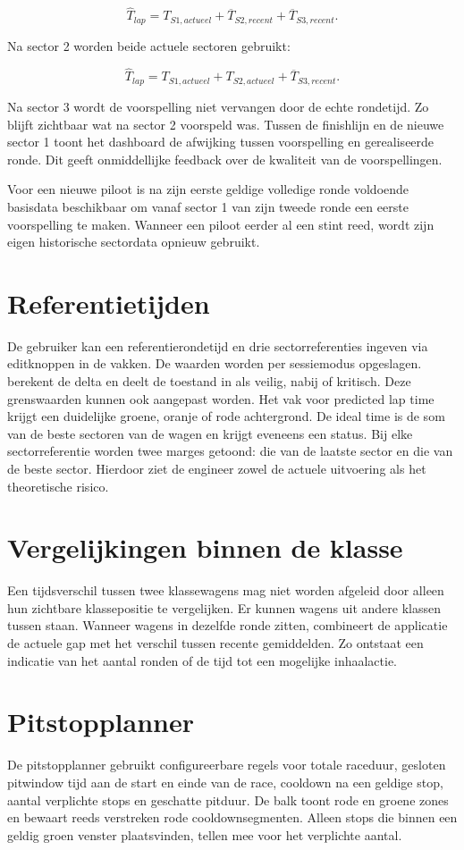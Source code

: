 \[ \hat{T}_{lap} = T_{S1,actueel} + \overline{T}_{S2,recent} + \overline{T}_{S3,recent}. \]

Na sector 2 worden beide actuele sectoren gebruikt:

\[ \hat{T}_{lap} = T_{S1,actueel} + T_{S2,actueel} + \overline{T}_{S3,recent}. \]

Na sector 3 wordt de voorspelling niet vervangen door de echte rondetijd. Zo blijft zichtbaar wat na
sector 2 voorspeld was. Tussen de finishlijn en de nieuwe sector 1 toont het dashboard de afwijking
tussen voorspelling en gerealiseerde ronde. Dit geeft onmiddellijke feedback over de kwaliteit van
de voorspellingen.

Voor een nieuwe piloot is na zijn eerste geldige volledige ronde voldoende basisdata beschikbaar om
vanaf sector 1 van zijn tweede ronde een eerste voorspelling te maken. Wanneer een piloot eerder al
een stint reed, wordt zijn eigen historische sectordata opnieuw gebruikt.

\section{Referentietijden}
De gebruiker kan een referentierondetijd en drie sectorreferenties ingeven via editknoppen in de vakken. De waarden worden per sessiemodus opgeslagen.  berekent de
delta en deelt de toestand in als veilig, nabij of kritisch. Deze grenswaarden kunnen ook aangepast worden.
Het vak voor predicted lap time krijgt een duidelijke groene, oranje of rode achtergrond. 
De ideal
time is de som van de beste sectoren van de wagen en krijgt
eveneens een status. Bij elke sectorreferentie worden twee marges getoond: die van de laatste sector
en die van de beste sector. Hierdoor ziet de engineer zowel de actuele uitvoering als het
theoretische risico.

\section{Vergelijkingen binnen de klasse}
Een tijdsverschil tussen twee klassewagens mag niet worden afgeleid door alleen hun zichtbare
klassepositie te vergelijken. Er kunnen wagens uit andere klassen tussen staan. 
Wanneer wagens in dezelfde ronde zitten, combineert de applicatie de actuele gap met het verschil
tussen recente gemiddelden. Zo ontstaat een indicatie van het aantal ronden of de tijd tot een
mogelijke inhaalactie. 

\section{Pitstopplanner}
De pitstopplanner gebruikt configureerbare regels voor totale raceduur, gesloten pitwindow tijd aan de start en einde van de race, cooldown na een geldige stop, aantal verplichte stops en geschatte pitduur. De balk
toont rode en groene zones en bewaart reeds verstreken rode cooldownsegmenten. Alleen stops die
binnen een geldig groen venster plaatsvinden, tellen mee voor het verplichte aantal.

